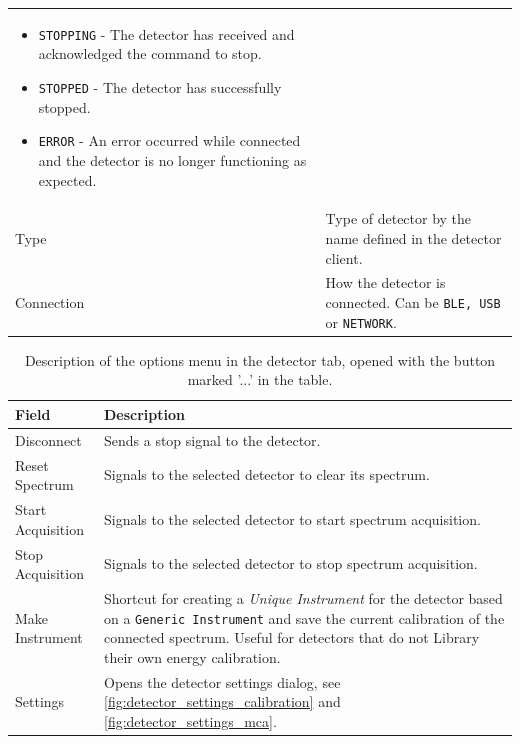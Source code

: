 \begin{table}[H]
\begin{tabular}{p{}p{}}
\begin{itemize}
            \item \texttt{STOPPING} - The detector has received and acknowledged the command to stop.
            \item \texttt{STOPPED} - The detector has successfully stopped.
            \item \texttt{ERROR} - An error occurred while connected and the detector is no longer functioning as expected.
        \end{itemize} \\
        Type & Type of detector by the name defined in the detector client. \\
        Connection & How the detector is connected. Can be \texttt{BLE, USB} or \texttt{NETWORK}. \\
    \bottomrule
    \end{tabular}
\end{table}

\begin{table}[H]
    \centering
    \caption{Description of the options menu in the detector tab, opened with the button marked '...' in the table.}
    \label{tab:detectors_options_button}
    \begin{tabular}{p{}p{}}
    \toprule
    \textbf{Field} & \textbf{Description} \\ \midrule
        Disconnect & Sends a stop signal to the detector. \\
        Reset Spectrum & Signals to the selected detector to clear its spectrum. \\
        Start Acquisition & Signals to the selected detector to start spectrum acquisition. \\
        Stop Acquisition & Signals to the selected detector to stop spectrum acquisition. \\
        Make Instrument & Shortcut for creating a \textit{Unique Instrument} for the detector based on a \texttt{Generic Instrument} and save the current calibration of the connected spectrum. Useful for detectors that do not Library their own energy calibration. \\
        Settings & Opens the detector settings dialog, see \autoref{fig:detector_settings_calibration} and \autoref{fig:detector_settings_mca}. \\
    \bottomrule
    \end{tabular}
\end{table}

